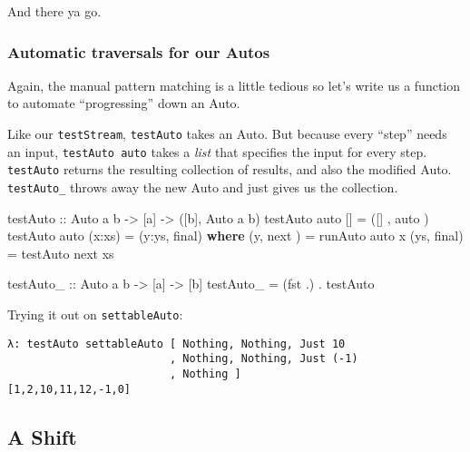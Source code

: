 \documentclass[]{article}
\newenvironment{Shaded}{}{}
\newcommand{\KeywordTok}[1]{\textcolor[rgb]{0.00,0.44,0.13}{\textbf{{#1}}}}
\newcommand{\DataTypeTok}[1]{\textcolor[rgb]{0.56,0.13,0.00}{{#1}}}
\newcommand{\OtherTok}[1]{\textcolor[rgb]{0.00,0.44,0.13}{{#1}}}
\newcommand{\FunctionTok}[1]{\textcolor[rgb]{0.02,0.16,0.49}{{#1}}}
\newcommand{\NormalTok}[1]{{#1}}
\begin{document}
And there ya go.

\subsubsection{Automatic traversals for our
Autos}\label{automatic-traversals-for-our-autos}

Again, the manual pattern matching is a little tedious so let's write us
a function to automate ``progressing'' down an Auto.

Like our \texttt{testStream}, \texttt{testAuto} takes an Auto. But
because every ``step'' needs an input, \texttt{testAuto\ auto} takes a
\emph{list} that specifies the input for every step. \texttt{testAuto}
returns the resulting collection of results, and also the modified Auto.
\texttt{testAuto\_} throws away the new Auto and just gives us the
collection.

\begin{Shaded}
\begin{Highlighting}[]
\OtherTok{testAuto ::} \DataTypeTok{Auto} \NormalTok{a b }\OtherTok{->} \NormalTok{[a] }\OtherTok{->} \NormalTok{([b], }\DataTypeTok{Auto} \NormalTok{a b)}
\NormalTok{testAuto auto []      }\FunctionTok{=} \NormalTok{([]  , auto )}
\NormalTok{testAuto auto (x}\FunctionTok{:}\NormalTok{xs)  }\FunctionTok{=} \NormalTok{(y}\FunctionTok{:}\NormalTok{ys, final)}
  \KeywordTok{where}
    \NormalTok{(y,  next ) }\FunctionTok{=} \NormalTok{runAuto  auto x}
    \NormalTok{(ys, final) }\FunctionTok{=} \NormalTok{testAuto next xs}

\OtherTok{testAuto_ ::} \DataTypeTok{Auto} \NormalTok{a b }\OtherTok{->} \NormalTok{[a] }\OtherTok{->} \NormalTok{[b]}
\NormalTok{testAuto_ }\FunctionTok{=} \NormalTok{(fst }\FunctionTok{.}\NormalTok{) }\FunctionTok{.} \NormalTok{testAuto}
\end{Highlighting}
\end{Shaded}

Trying it out on \texttt{settableAuto}:

\begin{verbatim}
λ: testAuto settableAuto [ Nothing, Nothing, Just 10
                         , Nothing, Nothing, Just (-1)
                         , Nothing ]
[1,2,10,11,12,-1,0]
\end{verbatim}

\subsection{A Shift}\label{a-shift}
\end{document}
